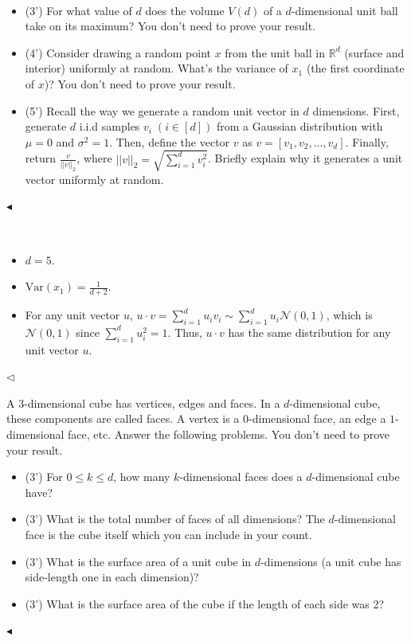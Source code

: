 ﻿\documentclass[11pt]{article}
\newenvironment{problem}[2][Problem]{\begin{trivlist}
\item[\hskip \labelsep {\bfseries #1}\hskip \labelsep {\bfseries #2.}]}{\hfill$\blacktriangleleft$\end{trivlist}}
\newenvironment{answer}[1][Answer]{\begin{trivlist}
\item[\hskip \labelsep {\bfseries #1.}\hskip \labelsep]}{\hfill$\lhd$\end{trivlist}}
\begin{document}
\begin{problem}{5 (12')} ~
\begin{itemize}
    \item [(1)] (3') For what value of $d$ does the volume $V(d)$ of a $d$-dimensional unit ball take on its maximum? You don't need to prove your result.
    \item [(2)] (4') Consider drawing a random point $x$ from the unit ball in $\mathbb{R}^d$ (surface and interior) uniformly at random. What's the variance of $x_1$ (the first coordinate of $x$)? You don't need to prove your result.
    \item [(3)] (5') Recall the way we generate a random unit vector in $d$ dimensions. First, generate $d$ i.i.d samples $v_i\;(i\in [d])$ from a Gaussian distribution with $\mu=0$ and $\sigma^2=1$. Then, define the vector $v$ as $v=[v_1,v_2,...,v_d]$. Finally, return $\frac{v}{||v||_2}$, where $||v||_2=\sqrt{\sum_{i=1}^d v_i^2}$. Briefly explain why it generates a unit vector uniformly at random.
\end{itemize}
\end{problem}

\begin{answer} ~
\begin{itemize}
    \item [(1)] $d=5$.
    \item [(2)] $\mathrm{Var}(x_1)=\frac{1}{d+2}$.
    \item [(3)] For any unit vector $u$, $u\cdot v=\sum_{i=1}^d u_i v_i\sim \sum_{i=1}^d u_i\mathcal N(0,1)$, which is $\mathcal N(0,1)$ since $\sum_{i=1}^d u_i^2=1$. Thus, $u\cdot v$ has the same distribution for any unit vector $u$.
\end{itemize}
\end{answer}



\begin{problem}{6 (12')}
A 3-dimensional cube has vertices, edges and faces. In a $d$-dimensional cube, these components are called faces. A vertex is a $0$-dimensional face, an edge a $1$-dimensional face, etc. Answer the following problems. You don't need to prove your result.
\begin{itemize}
    \item [(1)] (3') For $0\leq k\leq d$, how many $k$-dimensional faces does a $d$-dimensional cube have?
    \item [(2)] (3') What is the total number of faces of all dimensions? The $d$-dimensional face is the cube itself which you can include in your count.
    \item [(3)] (3') What is the surface area of a unit cube in $d$-dimensions (a unit cube has side-length one in each dimension)?
    \item [(4)] (3') What is the surface area of the cube if the length of each side was 2?
\end{itemize}
\end{problem}
\end{document}

